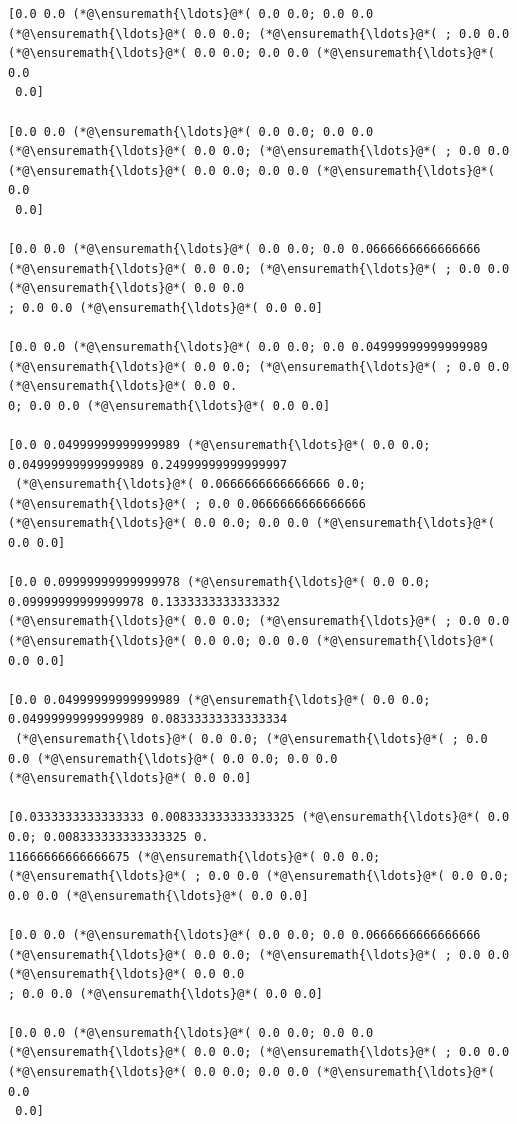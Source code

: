 \documentclass[12pt,a4paper]{article}
\begin{document}
\begin{lstlisting}
[0.0 0.0 (*@\ensuremath{\ldots}@*( 0.0 0.0; 0.0 0.0 (*@\ensuremath{\ldots}@*( 0.0 0.0; (*@\ensuremath{\ldots}@*( ; 0.0 0.0 (*@\ensuremath{\ldots}@*( 0.0 0.0; 0.0 0.0 (*@\ensuremath{\ldots}@*( 0.0
 0.0]

[0.0 0.0 (*@\ensuremath{\ldots}@*( 0.0 0.0; 0.0 0.0 (*@\ensuremath{\ldots}@*( 0.0 0.0; (*@\ensuremath{\ldots}@*( ; 0.0 0.0 (*@\ensuremath{\ldots}@*( 0.0 0.0; 0.0 0.0 (*@\ensuremath{\ldots}@*( 0.0
 0.0]

[0.0 0.0 (*@\ensuremath{\ldots}@*( 0.0 0.0; 0.0 0.0666666666666666 (*@\ensuremath{\ldots}@*( 0.0 0.0; (*@\ensuremath{\ldots}@*( ; 0.0 0.0 (*@\ensuremath{\ldots}@*( 0.0 0.0
; 0.0 0.0 (*@\ensuremath{\ldots}@*( 0.0 0.0]

[0.0 0.0 (*@\ensuremath{\ldots}@*( 0.0 0.0; 0.0 0.04999999999999989 (*@\ensuremath{\ldots}@*( 0.0 0.0; (*@\ensuremath{\ldots}@*( ; 0.0 0.0 (*@\ensuremath{\ldots}@*( 0.0 0.
0; 0.0 0.0 (*@\ensuremath{\ldots}@*( 0.0 0.0]

[0.0 0.04999999999999989 (*@\ensuremath{\ldots}@*( 0.0 0.0; 0.04999999999999989 0.24999999999999997
 (*@\ensuremath{\ldots}@*( 0.0666666666666666 0.0; (*@\ensuremath{\ldots}@*( ; 0.0 0.0666666666666666 (*@\ensuremath{\ldots}@*( 0.0 0.0; 0.0 0.0 (*@\ensuremath{\ldots}@*( 
0.0 0.0]

[0.0 0.09999999999999978 (*@\ensuremath{\ldots}@*( 0.0 0.0; 0.09999999999999978 0.1333333333333332 
(*@\ensuremath{\ldots}@*( 0.0 0.0; (*@\ensuremath{\ldots}@*( ; 0.0 0.0 (*@\ensuremath{\ldots}@*( 0.0 0.0; 0.0 0.0 (*@\ensuremath{\ldots}@*( 0.0 0.0]

[0.0 0.04999999999999989 (*@\ensuremath{\ldots}@*( 0.0 0.0; 0.04999999999999989 0.08333333333333334
 (*@\ensuremath{\ldots}@*( 0.0 0.0; (*@\ensuremath{\ldots}@*( ; 0.0 0.0 (*@\ensuremath{\ldots}@*( 0.0 0.0; 0.0 0.0 (*@\ensuremath{\ldots}@*( 0.0 0.0]

[0.0333333333333333 0.008333333333333325 (*@\ensuremath{\ldots}@*( 0.0 0.0; 0.008333333333333325 0.
11666666666666675 (*@\ensuremath{\ldots}@*( 0.0 0.0; (*@\ensuremath{\ldots}@*( ; 0.0 0.0 (*@\ensuremath{\ldots}@*( 0.0 0.0; 0.0 0.0 (*@\ensuremath{\ldots}@*( 0.0 0.0]

[0.0 0.0 (*@\ensuremath{\ldots}@*( 0.0 0.0; 0.0 0.0666666666666666 (*@\ensuremath{\ldots}@*( 0.0 0.0; (*@\ensuremath{\ldots}@*( ; 0.0 0.0 (*@\ensuremath{\ldots}@*( 0.0 0.0
; 0.0 0.0 (*@\ensuremath{\ldots}@*( 0.0 0.0]

[0.0 0.0 (*@\ensuremath{\ldots}@*( 0.0 0.0; 0.0 0.0 (*@\ensuremath{\ldots}@*( 0.0 0.0; (*@\ensuremath{\ldots}@*( ; 0.0 0.0 (*@\ensuremath{\ldots}@*( 0.0 0.0; 0.0 0.0 (*@\ensuremath{\ldots}@*( 0.0
 0.0]


\end{lstlisting}
\end{document}
